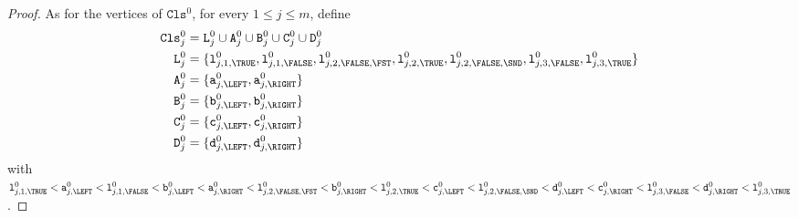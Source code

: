 \begin{proof}
    As for the vertices of $\texttt{Cls}^{0}$, for every $1 \leq j \leq m$, define
    \begin{align*}
      \texttt{Cls}^{0}_{j} &=
      \texttt{L}^{0}_{j} \cup
      \texttt{A}^{0}_{j} \cup
      \texttt{B}^{0}_{j} \cup
      \texttt{C}^{0}_{j} \cup
      \texttt{D}^{0}_{j}
      \\
      \texttt{L}^{0}_{j} &= \{
      \texttt{l}^{0}_{j,1,\TRUE},
      \texttt{l}^{0}_{j,1,\FALSE},
      \texttt{l}^{0}_{j,2,\FALSE,\FST},
      \texttt{l}^{0}_{j,2,\TRUE},
      \texttt{l}^{0}_{j,2,\FALSE,\SND},
      \texttt{l}^{0}_{j,3,\FALSE},
      \texttt{l}^{0}_{j,3,\TRUE}
      \}
      \\
      \texttt{A}^{0}_{j} &= \{\texttt{a}^{0}_{j,\LEFT}, \texttt{a}^{0}_{j,\RIGHT}\}
      \\
      \texttt{B}^{0}_{j} &= \{\texttt{b}^{0}_{j,\LEFT}, \texttt{b}^{0}_{j,\RIGHT}\}
      \\
      \texttt{C}^{0}_{j} &= \{\texttt{c}^{0}_{j,\LEFT}, \texttt{c}^{0}_{j,\RIGHT}\}
      \\
      \texttt{D}^{0}_{j} &= \{\texttt{d}^{0}_{j,\LEFT}, \texttt{d}^{0}_{j,\RIGHT}\}
    \end{align*}
    with
    $
    \texttt{l}^{0}_{j,1,\TRUE} <
    \texttt{a}^{0}_{j,\LEFT} <
    \texttt{l}^{0}_{j,1,\FALSE} <
    \texttt{b}^{0}_{j,\LEFT} <
    \texttt{a}^{0}_{j,\RIGHT} <
    \texttt{l}^{0}_{j,2,\FALSE,\FST} <
    \texttt{b}^{0}_{j,\RIGHT} <
    \texttt{l}^{0}_{j,2,\TRUE} <
    \texttt{c}^{0}_{j,\LEFT} <
    \texttt{l}^{0}_{j,2,\FALSE,\SND} <
    \texttt{d}^{0}_{j,\LEFT} <
    \texttt{c}^{0}_{j,\RIGHT} <
    \texttt{l}^{0}_{j,3,\FALSE} <
    \texttt{d}^{0}_{j,\RIGHT} <
    \texttt{l}^{0}_{j,3,\TRUE}
    $.


\end{proof}

